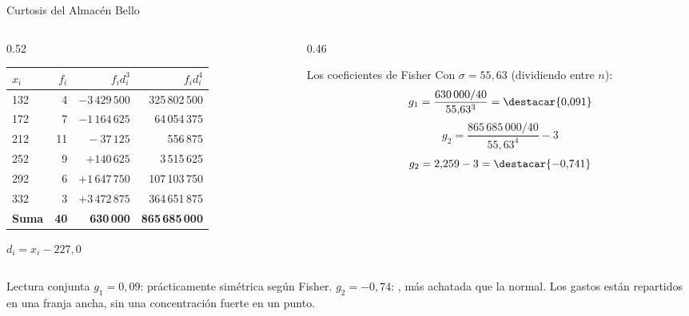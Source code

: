 \documentclass[aspectratio=169,10pt]{beamer}
\begin{document}
\begin{frame}{Curtosis del Almacén Bello}
  \scriptsize
  \begin{columns}[T,onlytextwidth]
    \begin{column}{0.52\textwidth}
      \centering
      \begin{tabular}{@{}lrrr@{}}
        \toprule
        \textbf{$x_i$} & \textbf{$f_i$} & \textbf{$f_i d_i^3$} &
        \textbf{$f_i d_i^4$} \\
        \midrule
        132 &  4 & $-3\,429\,500$ & 325\,802\,500 \\
        172 &  7 & $-1\,164\,625$ &  64\,054\,375 \\
        212 & 11 & $\ \ \ -37\,125$ &     556\,875 \\
        252 &  9 & $+140\,625$ &   3\,515\,625 \\
        292 &  6 & $+1\,647\,750$ & 107\,103\,750 \\
        332 &  3 & $+3\,472\,875$ & 364\,651\,875 \\
        \midrule
        \textbf{Suma} & \textbf{40} & \textbf{630\,000} &
        \textbf{865\,685\,000} \\
        \bottomrule
      \end{tabular}
      {\tiny $d_i = x_i - 227{,}0$}
    \end{column}
    \begin{column}{0.46\textwidth}
      \begin{block}{Los coeficientes de Fisher}
        \scriptsize
        Con $\sigma = 55{,}63$ (dividiendo entre $n$):
        \[ g_1 = \frac{630\,000/40}{55{,}63^3} = \destacar{0{,}091} \]
        \[ g_2 = \frac{865\,685\,000/40}{55{,}63^4} - 3 \]
        \[ g_2 = 2{,}259 - 3 = \destacar{-0{,}741} \]
      \end{block}
    \end{column}
  \end{columns}

  \vspace{0.05cm}
  \begin{alertblock}{Lectura conjunta}
    \tiny
    $g_1 = 0{,}09$: prácticamente simétrica según Fisher. \quad
    $g_2 = -0{,}74$: , más achatada que la normal. Los
    gastos están repartidos en una franja ancha, sin una concentración fuerte
    en un punto.
  \end{alertblock}
\end{frame}
\end{document}
